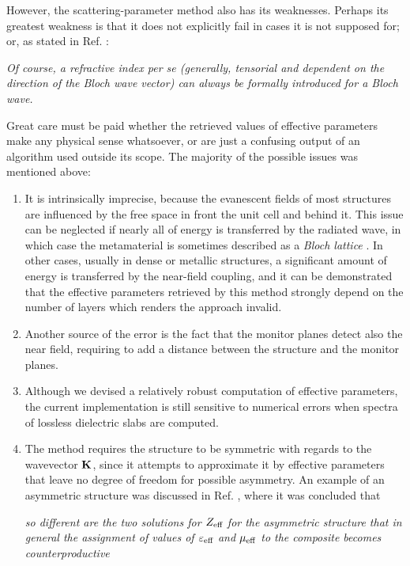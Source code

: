 \label{sparamweaknesses}
However, the scattering-parameter method also has its weaknesses. Perhaps its greatest weakness is that it does not explicitly fail in cases it is not supposed for; or, as stated in Ref. \cite{markel2013current}:
\begin{cite} 
\textit{Of course, a refractive index per se (generally, tensorial and dependent on the direction of the Bloch wave vector) can always be formally introduced for a Bloch wave.} 
\end{cite}
Great care must be paid whether the retrieved values of effective parameters make any physical sense whatsoever, or are just a confusing output of an algorithm used outside its scope. The majority of the possible issues was mentioned above:
\begin{enumerate}
		 \item{It is intrinsically imprecise, because the evanescent fields of most structures are influenced by the free space in front the unit cell and behind it. This issue can be neglected if nearly all of energy is transferred by the radiated wave, in which case the metamaterial is sometimes described as a \textit{Bloch lattice} \cite{simovski2007bloch, andryieuski2012bloch}. In other cases, usually in dense or metallic structures, a significant amount of energy is transferred by the near-field coupling, and it can be demonstrated that the effective parameters retrieved by this method strongly depend on the number of layers \cite{rockstuhl2008transition,andryieuski2010homogenization} which renders the approach invalid.
			 } 
		 \item{Another source of the error is the fact that the monitor planes detect also the near field, requiring to add a distance between the structure and the monitor planes.} 
		 \item{Although we devised a relatively robust computation of effective parameters, the current implementation is still sensitive to numerical errors when spectra of lossless dielectric slabs are computed.} 
		 \item{The method requires the structure to be symmetric with regards to the wavevector ${\mathbf{K}}$, since it attempts to approximate it by effective parameters that leave no degree of freedom for possible asymmetry. An example of an asymmetric structure was discussed in Ref. \cite{smith2005electromagnetic}, where it was concluded that
 \begin{displayquote} \textit{ so different are the two solutions for $Z_{\text{eff} }$ for the asymmetric structure that in general the assignment of values of $\varepsilon_{\text{eff} }$ and $\mu_{\text{eff} }$ to the composite becomes counterproductive} 

\end{displayquote}}
\end{enumerate}
